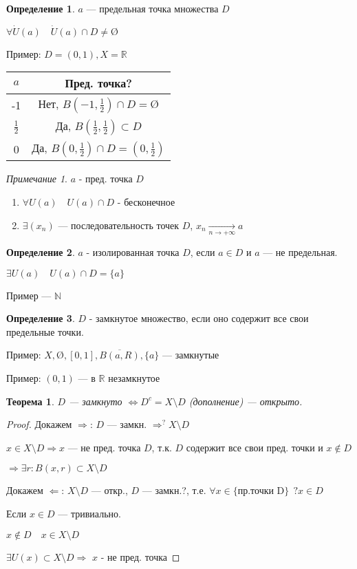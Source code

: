 \documentclass[12pt]{article}
\theoremstyle{plain}
\newtheorem{theorem}{Теорема}
\theoremstyle{remark}
\newtheorem*{remark}{Примечание}
\theoremstyle{definition}
\newtheorem*{definition}{Определение}
\begin{document}
\begin{definition}
    $a$ --- предельная точка множества $D$
    
    $\forall \dot U(a) \quad \dot U(a)\cap D\not = \text{\O}$
\end{definition}

Пример: $D=(0,1), X=\mathbb{R}$

\begin{tabular}{c|c}
    $a$&Пред. точка? \\
    \hline
    -1& Нет, $B(-1, \frac{1}{2})\cap D=\text{\O}$\\
    \hline
    $\frac{1}{2}$ & Да, $B(\frac{1}{2}, \frac{1}{2})\subset D$\\
    \hline
    0 & Да, $B(0,\frac{1}{2})\cap D = (0, \frac{1}{2})$
\end{tabular}

\begin{remark}
    $a$ - пред. точка $D$
    \begin{enumerate}
        \item $\forall U(a) \quad U(a)\cap D$ - бесконечное
        \item $\exists (x_n)$ --- последовательность точек $D$, $x_n\underset{n\to +\infty}\to a$
    \end{enumerate}
\end{remark}

\begin{definition}
    $a$ - изолированная точка $D$, если $a\in D$ и $a$ --- не предельная.

    $\exists U(a) \quad U(a)\cap D = \{a\}$
\end{definition}

Пример --- $\mathbb{N}$

\begin{definition}
    $D$ - замкнутое множество, если оно содержит все свои предельные точки.
\end{definition}

Пример: $X, \text{\O}, [0,1], \overline{B(a,R)}, \{a\}$ --- замкнутые

Пример: $(0, 1)$ --- в $\mathbb{R}$ незамкнутое

\begin{theorem}
    $D$ --- замкнуто $\Leftrightarrow D^c=X\setminus D$ \textit{(дополнение)} --- открыто.
\end{theorem}

\begin{proof}
    Докажем $\Rightarrow$: $D$ --- замкн. $\Rightarrow^? X\setminus D$

    $x\in X\setminus D \Rightarrow x$ --- не пред. точка $D$, т.к. $D$ содержит все свои пред. точки и $x\not\in D$ 
    
    $\Rightarrow\exists r : B(x,r)\subset X\setminus D$

    Докажем $\Leftarrow$: $X\setminus D$ --- откр., $D$ --- замкн.?, т.е. $\forall x\in\{\text{пр.точки D}\} \ \ ?x\in D$

    Если $x\in D$ --- тривиально.

    $x\not\in D\quad x\in X\setminus D$

    $\exists U(x)\subset X\setminus D \Rightarrow$ $x$ - не пред. точка
\end{proof}
\end{document}

